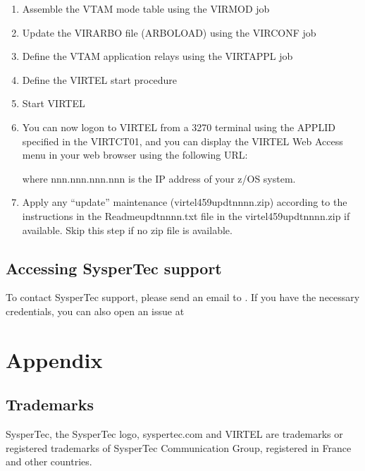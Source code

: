 \documentclass[letterpaper,10pt,english]{sphinxmanual}
\begin{document}
\begin{enumerate}
\item {} 
Assemble the VTAM mode table using the VIRMOD job

\item {} 
Update the VIRARBO file (ARBOLOAD) using the VIRCONF job

\item {} 
Define the VTAM application relays using the VIRTAPPL job

\item {} 
Define the VIRTEL start procedure

\item {} 
Start VIRTEL

\item {} 
You can now logon to VIRTEL from a 3270 terminal using the APPLID specified in the VIRTCT01, and you can display the VIRTEL Web Access menu in your web browser using the following URL:
\begin{quote}

\end{quote}

where nnn.nnn.nnn.nnn is the IP address of your z/OS system.

\item {} 
Apply any “update” maintenance (virtel459updtnnnn.zip) according to the instructions in the Readme\sphinxhyphen{}updtnnnn.txt file in the virtel459updtnnnn.zip if available. Skip this step if no zip file is available.

\end{enumerate}


\section{Accessing SysperTec support}
\label{\detokenize{Getting_Started:accessing-syspertec-support}}
To contact SysperTec support, please send an email to . If you have the necessary credentials, you can also open an issue at 


\chapter{Appendix}
\label{\detokenize{Getting_Started:appendix}}

\section{Trademarks}
\label{\detokenize{Getting_Started:trademarks}}
SysperTec, the SysperTec logo, syspertec.com and VIRTEL are trademarks or registered trademarks of SysperTec
Communication Group, registered in France and other countries.
\end{document}
